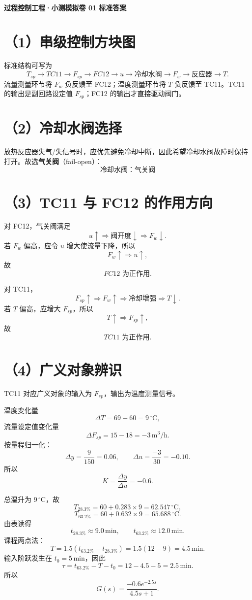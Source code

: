 \documentclass[UTF8,a4paper,11pt]{ctexart}
\begin{document}
\begin{center}
{\LARGE\bfseries 过程控制工程·小测模拟卷 01 标准答案}
\end{center}

\section*{（1）串级控制方块图}
标准结构可写为
\[
T_{sp}\rightarrow \boxed{TC11}\rightarrow F_{sp}
\rightarrow \boxed{FC12}\rightarrow u
\rightarrow \boxed{冷却水阀}\rightarrow F_w
\rightarrow \boxed{反应器}\rightarrow T.
\]
流量测量环节将 $F_w$ 负反馈至 FC12；温度测量环节将 $T$ 负反馈至 TC11。TC11 的输出是副回路设定值 $F_{sp}$；FC12 的输出才直接驱动阀门。

\section*{（2）冷却水阀选择}
放热反应器失气/失信号时，应优先避免冷却中断，因此希望冷却水阀故障时保持打开。故选\textbf{气关阀}（fail-open）：
\[
\boxed{\text{冷却水阀：气关阀}}
\]

\section*{（3）TC11 与 FC12 的作用方向}
对 FC12，气关阀满足
\[
u\uparrow\Rightarrow\text{阀开度}\downarrow\Rightarrow F_w\downarrow.
\]
若 $F_w$ 偏高，应令 $u$ 增大使流量下降，所以
\[
F_w\uparrow\Rightarrow u\uparrow,
\]
故
\[
\boxed{FC12\text{ 为正作用}}.
\]

对 TC11，
\[
F_{sp}\uparrow\Rightarrow F_w\uparrow\Rightarrow\text{冷却增强}\Rightarrow T\downarrow.
\]
若 $T$ 偏高，应增大 $F_{sp}$，所以
\[
T\uparrow\Rightarrow F_{sp}\uparrow,
\]
故
\[
\boxed{TC11\text{ 为正作用}}.
\]

\section*{（4）广义对象辨识}
TC11 对应广义对象的输入为 $F_{sp}$，输出为温度测量信号。

温度变化量
\[
\Delta T=69-60=9\,^{\circ}\mathrm C,
\]
流量设定值变化量
\[
\Delta F_{sp}=15-18=-3\,\mathrm{m^3/h}.
\]
按量程归一化：
\[
\Delta y=\frac{9}{150}=0.06,\qquad
\Delta u=\frac{-3}{30}=-0.10.
\]
所以
\[
\boxed{K=\frac{\Delta y}{\Delta u}=-0.6}.
\]

总温升为 $9\,^{\circ}\mathrm C$，故
\[
T_{28.3\%}=60+0.283\times 9=62.547\,^{\circ}\mathrm C,
\]
\[
T_{63.2\%}=60+0.632\times 9=65.688\,^{\circ}\mathrm C.
\]
由表读得
\[
t_{28.3\%}\approx9.0\,\mathrm{min},\qquad
t_{63.2\%}\approx12.0\,\mathrm{min}.
\]
课程两点法：
\[
T=1.5\left(t_{63.2\%}-t_{28.3\%}\right)=1.5(12-9)=4.5\,\mathrm{min}.
\]
输入阶跃发生在 $t_0=5\,\mathrm{min}$，因此
\[
\tau=t_{63.2\%}-T-t_0=12-4.5-5=2.5\,\mathrm{min}.
\]
所以
\[
\boxed{G(s)=\frac{-0.6e^{-2.5s}}{4.5s+1}}.
\]
\end{document}
